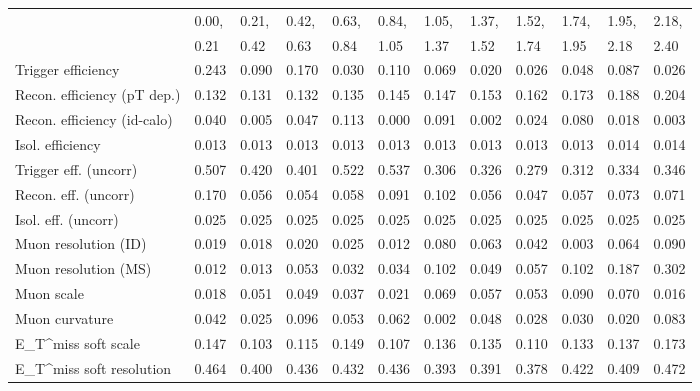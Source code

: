 \begin{tabular}{l|p{0.6cm}p{0.6cm}p{0.6cm}p{0.6cm}p{0.6cm}p{0.6cm}p{0.6cm}p{0.6cm}p{0.6cm}p{0.6cm}p{0.6cm}}
\hline
   & 0.00, & 0.21, & 0.42, & 0.63, & 0.84, & 1.05, & 1.37, & 1.52, & 1.74, & 1.95, & 2.18,  \\ 
   & 0.21 & 0.42 & 0.63 & 0.84 & 1.05 & 1.37 & 1.52 & 1.74 & 1.95 & 2.18 & 2.40  \\ 
\hline
Trigger efficiency                       & 0.243 & 0.090 & 0.170 & 0.030 & 0.110 & 0.069 & 0.020 & 0.026 & 0.048 & 0.087 & 0.026 \\
Recon. efficiency (pT dep.)              & 0.132 & 0.131 & 0.132 & 0.135 & 0.145 & 0.147 & 0.153 & 0.162 & 0.173 & 0.188 & 0.204 \\
Recon. efficiency (id-calo)              & 0.040 & 0.005 & 0.047 & 0.113 & 0.000 & 0.091 & 0.002 & 0.024 & 0.080 & 0.018 & 0.003 \\
Isol. efficiency                         & 0.013 & 0.013 & 0.013 & 0.013 & 0.013 & 0.013 & 0.013 & 0.013 & 0.013 & 0.014 & 0.014 \\
Trigger eff. (uncorr)                    & 0.507 & 0.420 & 0.401 & 0.522 & 0.537 & 0.306 & 0.326 & 0.279 & 0.312 & 0.334 & 0.346 \\
Recon. eff. (uncorr)                     & 0.170 & 0.056 & 0.054 & 0.058 & 0.091 & 0.102 & 0.056 & 0.047 & 0.057 & 0.073 & 0.071 \\
Isol. eff. (uncorr)                      & 0.025 & 0.025 & 0.025 & 0.025 & 0.025 & 0.025 & 0.025 & 0.025 & 0.025 & 0.025 & 0.025 \\
Muon resolution (ID)                     & 0.019 & 0.018 & 0.020 & 0.025 & 0.012 & 0.080 & 0.063 & 0.042 & 0.003 & 0.064 & 0.090 \\
Muon resolution (MS)                     & 0.012 & 0.013 & 0.053 & 0.032 & 0.034 & 0.102 & 0.049 & 0.057 & 0.102 & 0.187 & 0.302 \\
Muon scale                               & 0.018 & 0.051 & 0.049 & 0.037 & 0.021 & 0.069 & 0.057 & 0.053 & 0.090 & 0.070 & 0.016 \\
Muon curvature                           & 0.042 & 0.025 & 0.096 & 0.053 & 0.062 & 0.002 & 0.048 & 0.028 & 0.030 & 0.020 & 0.083 \\
E_{T}^{miss} soft scale                  & 0.147 & 0.103 & 0.115 & 0.149 & 0.107 & 0.136 & 0.135 & 0.110 & 0.133 & 0.137 & 0.173 \\
E_{T}^{miss} soft resolution             & 0.464 & 0.400 & 0.436 & 0.432 & 0.436 & 0.393 & 0.391 & 0.378 & 0.422 & 0.409 & 0.472 \\

\end{tabular}
